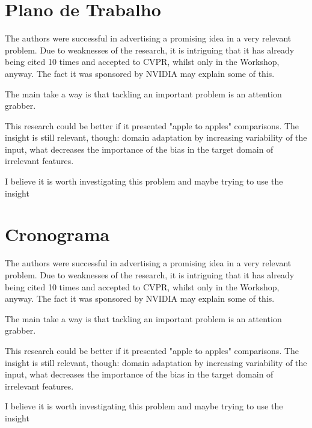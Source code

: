\documentclass[
12pt, %
a4paper, %
onecolumn, %
]{article}
\begin{document}
\section{Plano de Trabalho}

The authors were successful in advertising a promising idea in a very relevant problem.  Due to weaknesses of the research, it is intriguing that it has already being cited 10 times and accepted to CVPR, whilst only in the Workshop, anyway. The fact it was sponsored by NVIDIA may explain some of this.

The main take a way is that tackling an important problem is an attention grabber. 

This research could be better if it presented "apple to apples" comparisons. The insight is still relevant, though: domain adaptation by increasing variability of the input, what decreases the importance of the bias in the target domain of irrelevant features.

I believe it is worth investigating this problem and maybe trying to use the insight


\section{Cronograma}

The authors were successful in advertising a promising idea in a very relevant problem.  Due to weaknesses of the research, it is intriguing that it has already being cited 10 times and accepted to CVPR, whilst only in the Workshop, anyway. The fact it was sponsored by NVIDIA may explain some of this.

The main take a way is that tackling an important problem is an attention grabber. 

This research could be better if it presented "apple to apples" comparisons. The insight is still relevant, though: domain adaptation by increasing variability of the input, what decreases the importance of the bias in the target domain of irrelevant features.

I believe it is worth investigating this problem and maybe trying to use the insight


%

\renewcommand{\refname}{Bibliografia} %


\end{document}
